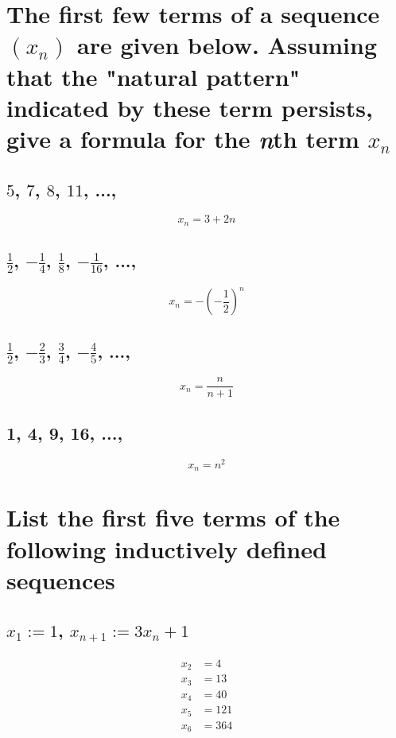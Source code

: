 \documentclass{article}
\begin{document}
\section{The first few terms of a sequence $(x_n)$ are given below. Assuming that the "natural pattern" indicated by these term persists, give a formula for the \textit{n}th term $x_n$}

\subsection{$5$, $7$, $8$, $11$, ...,}
\begin{equation*}
    x_n = 3 + 2n
\end{equation*}

\subsection{$\frac{1}{2}$, $-\frac{1}{4}$, $\frac{1}{8}$, $-\frac{1}{16}$, ...,}
\begin{equation*}
    x_n = -(-\frac{1}{2})^n
\end{equation*}

\subsection{$\frac{1}{2}$, $-\frac{2}{3}$, $\frac{3}{4}$, $-\frac{4}{5}$, ...,}
\begin{equation*}
    x_n = \frac{n}{n+1}
\end{equation*}

\subsection{1, 4, 9, 16, ...,}
\begin{equation*}
    x_n = n^2
\end{equation*}

\section{List the first five terms of the following inductively defined sequences}
\subsection{$x_1 := 1$, $x_{n + 1} := 3x_n + 1$}

\begin{align*}
    x_2 & = 4 \\
    x_3 & = 13 \\
    x_4 & = 40 \\
    x_5 & = 121 \\
    x_6 & = 364 
\end{align*}
\end{document}
